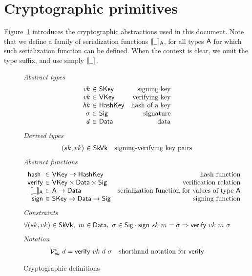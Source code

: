 \section{Cryptographic primitives}
\label{sec:crypto-primitives}

Figure~\ref{fig:crypto-defs} introduces the cryptographic abstractions used in
this document. Note that we define a family of serialization functions
$\serialised{\wcard}_\type{A}$, for all types $\mathsf{A}$ for which such
serialization function can be defined. When the context is clear, we omit the
type suffix, and use simply $\serialised{\wcard}$.

\begin{figure}[htb]
  \emph{Abstract types}
  \begin{equation*}
    \begin{array}{r@{~\in~}lr}
      \var{vk} & \SKey & \text{signing key}\\
      \var{vk} & \VKey & \text{verifying key}\\
      \var{hk} & \HashKey & \text{hash of a key}\\
      \sigma & \Sig  & \text{signature}\\
      \var{d} & \Data  & \text{data}\\
    \end{array}
  \end{equation*}
  \emph{Derived types}
  \begin{equation*}
    \begin{array}{r@{~\in~}lr}
      (sk, vk) & \SkVk & \text{signing-verifying key pairs}
    \end{array}
  \end{equation*}
  \emph{Abstract functions}
  \begin{equation*}
    \begin{array}{r@{~\in~}lr}
      \hash{} & \VKey \to \HashKey
      & \text{hash function} \\
      \fun{verify} & \VKey \times \Data \times \Sig
      & \text{verification relation}\\
      \serialised{\wcard}_\type{A} & \type{A} \to \Data
      & \text{serialization function for values of type $\type{A}$}\\
      \fun{sign} & \SKey \to \Data \to \Sig
      & \text{signing function}
    \end{array}
  \end{equation*}
  \emph{Constraints}
  \begin{align*}
    & \forall (sk, vk) \in \mathsf{SkVk},~ m \in \mathsf{Data},~ \sigma \in \mathsf{Sig} \cdot
      \mathsf{sign} ~ sk ~ m = \sigma \Rightarrow \mathsf{verify} ~ vk ~ m ~ \sigma
  \end{align*}
  \emph{Notation}
  \begin{align*}
    & \mathcal{V}^\sigma_{\mathit{vk}}~{d} = \mathsf{verify} ~ vk ~ d ~ \sigma
      & \text{shorthand notation for } \mathsf{verify}
  \end{align*}
  \caption{Cryptographic definitions}
  \label{fig:crypto-defs}
\end{figure}

